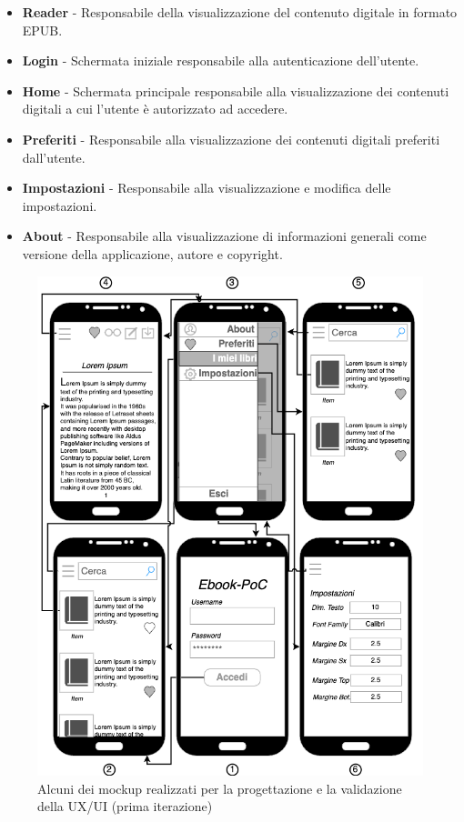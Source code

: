 \begin{itemize}
    \item \textbf{Reader} - Responsabile della visualizzazione del contenuto digitale in formato EPUB.
    \item \textbf{Login} - Schermata iniziale responsabile alla autenticazione dell'utente.
    \item \textbf{Home} - Schermata principale responsabile alla visualizzazione dei contenuti digitali a cui l'utente è autorizzato ad accedere.
    \item \textbf{Preferiti} - Responsabile alla visualizzazione dei contenuti digitali preferiti dall'utente.
    \item \textbf{Impostazioni} - Responsabile alla visualizzazione e modifica delle impostazioni.
    \item \textbf{About} - Responsabile alla visualizzazione di informazioni generali come versione della applicazione, autore e copyright.
\end{itemize}

\begin{figure}[H]
    \centering
    \includegraphics[width=1\textwidth]{img/mockup-uiux-1.png}
    \caption{Alcuni dei mockup realizzati per la progettazione e la validazione della UX/UI (prima iterazione)}
\end{figure}


